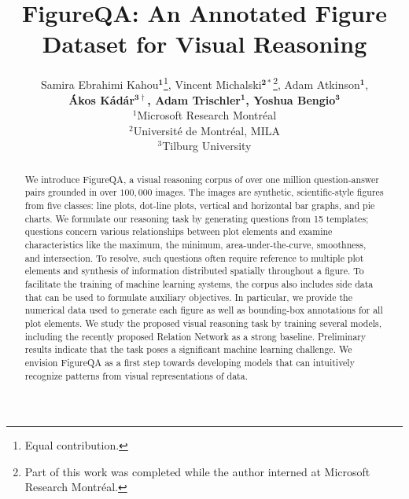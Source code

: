 \documentclass{article} %
\title{FigureQA: An Annotated Figure Dataset for Visual Reasoning}
\author{
Samira Ebrahimi Kahou$\mathbf{^1}$\thanks{Equal contribution.}, Vincent Michalski$\mathbf{^{2\ast}}$\thanks{Part of this work was completed while the author interned at Microsoft Research Montréal.}, Adam Atkinson$\mathbf{^1}$, \\\textbf{Ákos Kádár$\mathbf{^{3\dag}}$, Adam Trischler$\mathbf{^1}$, Yoshua Bengio$\mathbf{^3}$}\\
$^1$Microsoft Research Montréal\\
$^2$Université de Montréal, MILA\\
$^3$Tilburg University
}
\begin{document}

\maketitle
\begin{abstract}
We introduce FigureQA, a visual reasoning corpus of over one million question-answer pairs grounded in over $100,000$ images.
The images are synthetic, scientific-style figures from five classes: line plots, dot-line plots, vertical and horizontal bar graphs, and pie charts.
We formulate our reasoning task by generating questions from 15 templates; questions concern various relationships between plot elements and examine characteristics like the maximum, the minimum, area-under-the-curve, smoothness, and intersection.
To resolve, such questions often require reference to multiple plot elements and synthesis of information distributed spatially throughout a figure.
To facilitate the training of machine learning systems, the corpus also includes side data that can be used to formulate auxiliary objectives. In particular,
we provide the numerical data used to generate each figure as well as bounding-box annotations for all plot elements.
We study the proposed visual reasoning task by training several models, including the recently proposed Relation Network as a strong baseline.
Preliminary results indicate that the task poses a significant machine learning challenge.
We envision FigureQA as a first step towards developing models that can intuitively recognize patterns from visual representations of data.
\end{abstract}
\end{document}
